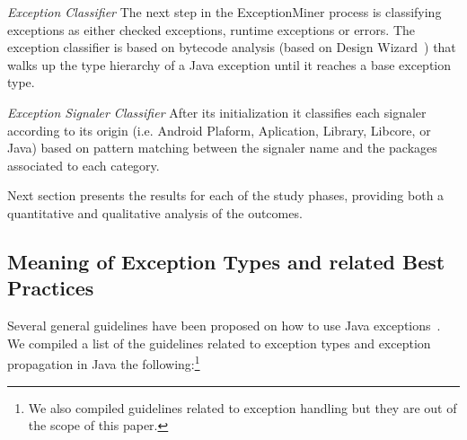 \documentclass[conference]{IEEEtran}
\begin{document}


\noindent\emph{Exception Classifier} The next step in the ExceptionMiner process
is classifying exceptions as either checked exceptions, runtime exceptions or 
errors. The exception classifier is based on bytecode analysis (based on Design
Wizard~\cite{Brunet09}) that walks up the type hierarchy of a Java exception
until it reaches a base exception type.

\noindent\emph{Exception Signaler Classifier} After its initialization it
classifies each signaler according to its origin (i.e. Android Plaform,
Aplication, Library, Libcore, or Java) based on pattern matching between the
signaler name and the packages associated to each category.

Next section presents the results for each of the study phases, providing both a
quantitative and qualitative analysis of the outcomes.



\subsection{Meaning of Exception Types and related Best Practices}
\label{sec:best}

Several general guidelines have been proposed on how to use Java
exceptions~\cite{mandrioli1992advances,gosling2000java,wirfs2006toward,
bloch2008effective}. 
We compiled a list of the guidelines related to exception types and exception
propagation in Java the following:\footnote{We also compiled guidelines related
to exception handling but they are out of the scope of this paper.}
\end{document}

